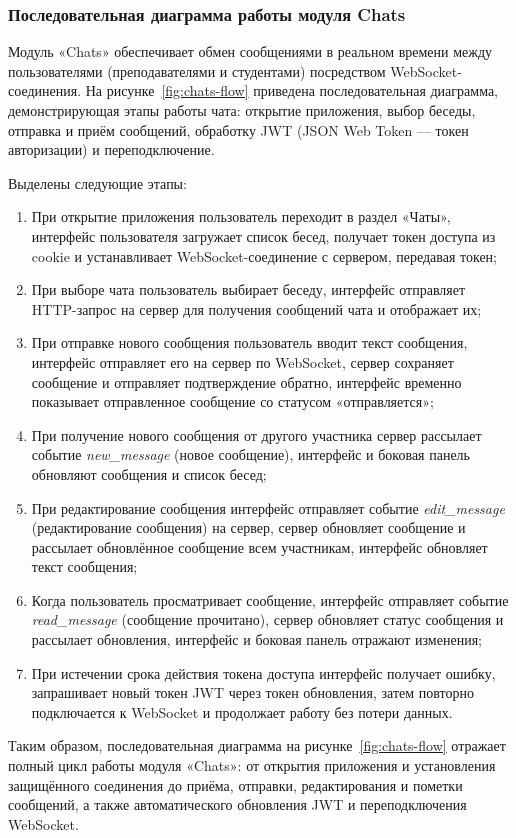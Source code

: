 \subsubsection{Последовательная диаграмма работы модуля Chats}
Модуль «Chats» обеспечивает обмен сообщениями в реальном времени между пользователями (преподавателями и студентами) посредством WebSocket-соединения. На рисунке~\ref{fig:chats-flow} приведена последовательная диаграмма, демонстрирующая этапы работы чата: открытие приложения, выбор беседы, отправка и приём сообщений, обработку JWT (JSON Web Token — токен авторизации) и переподключение.

Выделены следующие этапы:

\begin{enumerate}
    \item При открытие приложения пользователь переходит в раздел «Чаты», интерфейс пользователя загружает список бесед, получает токен доступа из cookie и устанавливает WebSocket-соединение с сервером, передавая токен;
    \item При выборе чата пользователь выбирает беседу, интерфейс отправляет HTTP-запрос на сервер для получения сообщений чата и отображает их;
    \item При отправке нового сообщения пользователь вводит текст сообщения, интерфейс отправляет его на сервер по WebSocket, сервер сохраняет сообщение и отправляет подтверждение обратно, интерфейс временно показывает отправленное сообщение со статусом «отправляется»;
    \item При получение нового сообщения от другого участника сервер рассылает событие \textit{new\_message} (новое сообщение), интерфейс и боковая панель обновляют сообщения и список бесед;
    \item При редактирование сообщения интерфейс отправляет событие \textit{edit\_message} (редактирование сообщения) на сервер, сервер обновляет сообщение и рассылает обновлённое сообщение всем участникам, интерфейс обновляет текст сообщения;
    \item Когда пользователь просматривает сообщение, интерфейс отправляет событие \textit{read\_message} (сообщение прочитано), сервер обновляет статус сообщения и рассылает обновления, интерфейс и боковая панель отражают изменения;
    \item При истечении срока действия токена доступа интерфейс получает ошибку, запрашивает новый токен JWT через токен обновления, затем повторно подключается к WebSocket и продолжает работу без потери данных.
\end{enumerate}

Таким образом, последовательная диаграмма на рисунке~\ref{fig:chats-flow} отражает полный цикл работы модуля «Chats»: от открытия приложения и установления защищённого соединения до приёма, отправки, редактирования и пометки сообщений, а также автоматического обновления JWT и переподключения WebSocket. 
